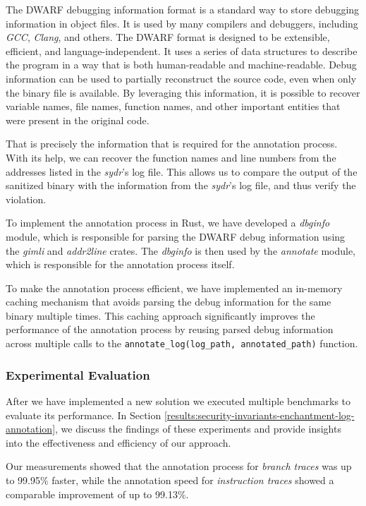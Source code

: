 The DWARF debugging information format is a standard way to store debugging information in object files. It is used by many compilers and debuggers, including \textit{GCC}, \textit{Clang}, and others. The DWARF format is designed to be extensible, efficient, and language-independent. It uses a series of data structures to describe the program in a way that is both human-readable and machine-readable. Debug information can be used to partially reconstruct the source code, even when only the binary file is available. By leveraging this information, it is possible to recover variable names, file names, function names, and other important entities that were present in the original code.

That is precisely the information that is required for the annotation process. With its help, we can recover the function names and line numbers from the addresses listed in the \textit{sydr}'s log file. This allows us to compare the output of the sanitized binary with the information from the \textit{sydr}'s log file, and thus verify the violation.


To implement the annotation process in Rust, we have developed a \textit{dbginfo} module, which is responsible for parsing the DWARF debug information using the \textit{gimli} and \textit{addr2line} crates. The \textit{dbginfo} is then used by the \textit{annotate} module, which is responsible for the annotation process itself.

To make the annotation process efficient, we have implemented an in-memory caching mechanism that avoids parsing the debug information for the same binary multiple times. This caching approach significantly improves the performance of the annotation process by reusing parsed debug information across multiple calls to the \texttt{annotate_log(log_path, annotated_path)} function.

\subsubsection{Experimental Evaluation}

After we have implemented a new solution we executed multiple benchmarks to evaluate its performance. In Section \ref{results:security-invariants-enchantment-log-annotation}, we discuss the findings of these experiments and provide insights into the effectiveness and efficiency of our approach.


Our measurements showed that the annotation process for \textit{branch traces} was up to 99.95\% faster, while the annotation speed for \textit{instruction traces} showed a comparable improvement of up to 99.13\%.

